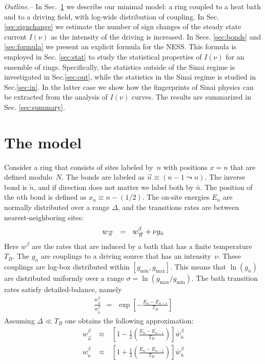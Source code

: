 \documentclass[aps,pre,floats,floatfix,twocolumn]{revtex4}
\newcommand{\mylabel}[1]{\label{#1}}
\newcommand{\beq}{\begin{eqnarray}}
\newcommand{\eeq}{\end{eqnarray}}
\newcommand{\be}[1]{\begin{eqnarray}\ifthenelse{#1=-1}
{\nonumber}{\ifthenelse{#1=0}{}{\mylabel{e#1}}}}
\newcommand{\rmrk}[1]{{#1}}    %
\begin{document}
\rmrk{{\em Outline.-- } 
%
In Sec.~\ref{sec:model} we describe our minimal model:
a ring coupled to a heat bath and to a driving field, 
with log-wide distribution of coupling.
%
In Sec. \ref{sec:signchange} we estimate the number of sign changes 
of the steady state current $I(\nu)$ as the intensity of the driving 
is increased.
%
In Secs. \ref{sec:bonds} and \ref{sec:formula} we present 
an explicit formula for the NESS. This formula is employed 
in Sec. \ref{sec:stat} to study the  statistical properties 
of $I(\nu)$ for an ensemble of rings. 
%
Specifically, the statistics outside of the Sinai regime 
is investigated in Sec.\ref{sec:out}, while the statistics 
in the Sinai regime is studied in Sec.\ref{sec:in}. 
In the latter case we show how the fingerprints of Sinai physics 
can be extracted from the analysis of $I(\nu)$ curves. 
%
The results are summarized in Sec. \ref{sec:summary}.}



\section{The model}
\label{sec:model}
Consider a ring that consists of sites labeled by~$n$ 
with positions ${x=n}$ that are defined modulo~$N$. 
The bonds are labeled as ${\overrightarrow{n}\equiv(n{-}1 \leadsto n)}$.
The inverse bond is $\overleftarrow{n}$, and if direction does 
not matter we label both by $\bar{n}$. The position of the $n$th bond 
is defined as $x_n \equiv n{-}(1/2)$. The on-site energies $E_n$ 
are normally distributed over a range $\Delta$,  
and the transitions rates are between nearest-neighboring sites:   
%
\be{1}
w_{\overrightarrow{n}} \ \ = \ \ w^{\beta}_{\overrightarrow{n}} + \nu g_{\bar{n}}
\eeq 
%
Here $w^{\beta}$ are the rates that are induced by a bath that has 
a finite temperature $T_B$. The $g_{\bar{n}}$ are 
couplings to a driving source that has an intensity~$\nu$. 
These couplings are log-box distributed within ${[g_{\text{min}},g_{\text{max}}]}$.
This means that $\ln(g_{\bar{n}})$ are distributed uniformly 
over a range ${\sigma=\ln(g_{\text{max}}/g_{\text{min}})}$. 
%
%
The bath transition rates satisfy detailed-balance, namely 
%
\beq
\frac{w^{\beta}_{\overrightarrow{n}}}{w^{\beta}_{\overleftarrow{n}}} 
\ \  = \ \ \exp\left[-\frac{E_{n}{-}E_{n{-}1}}{T_B}\right]
\eeq
%
Assuming ${\Delta \ll T_B}$ one obtains the following approximation: 
%
\beq
w^{\beta}_{\overrightarrow{n}} \ &\approx& \ \left[1-\frac{1}{2}\left(\frac{E_n-E_{n{-}1}}{T_B}\right)\right]\bar{w}_{\bar{n}}^{\beta} \\ 
w^{\beta}_{\overleftarrow{n}} \ &\approx& \ \left[1+\frac{1}{2}\left(\frac{E_n-E_{n{-}1}}{T_B}\right)\right]\bar{w}_{\bar{n}}^{\beta}
\eeq  
\end{document}
